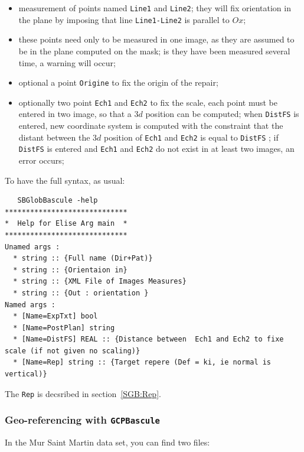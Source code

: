 \begin{itemize}
   \item measurement of points named {\tt Line1} and  {\tt Line2};
	 they will fix orientation in the plane by imposing that line
	   {\tt Line1-Line2} is parallel to $Ox$;

   \item these points need only to be measured in one image, as they are
	 assumed  to be in the plane  computed on the mask; is they have been
	 measured several time, a warning will occur;

   \item optional a point {\tt Origine} to fix the origin of the repair;

   \item optionally two point {\tt Ech1} and {\tt Ech2} to fix the scale,
	 each point must be entered in two image, so that a $3d$ position
	 can be computed; when {\tt DistFS} is entered, new coordinate system
	 is computed with the constraint that the distant between the $3d$
	 position of  {\tt Ech1} and {\tt Ech2} is equal to {\tt DistFS} ;
	 if {\tt DistFS} is entered and {\tt Ech1} and {\tt Ech2} do not
	 exist in at least two images, an error occurs;
\end{itemize}

To have the full syntax, as usual:

\begin{verbatim}
   SBGlobBascule -help
*****************************
*  Help for Elise Arg main  *
*****************************
Unamed args :
  * string :: {Full name (Dir+Pat)}
  * string :: {Orientaion in}
  * string :: {XML File of Images Measures}
  * string :: {Out : orientation }
Named args :
  * [Name=ExpTxt] bool
  * [Name=PostPlan] string
  * [Name=DistFS] REAL :: {Distance between  Ech1 and Ech2 to fixe scale (if not given no scaling)}
  * [Name=Rep] string :: {Target repere (Def = ki, ie normal is vertical)}
\end{verbatim}

The {\tt Rep} is decsribed in section~\ref{SGB:Rep}.


\subsubsection{Geo-referencing with {\tt GCPBascule}}

\label{Sec:GCPBascule}

In the Mur Saint Martin data set, you can find two files:


